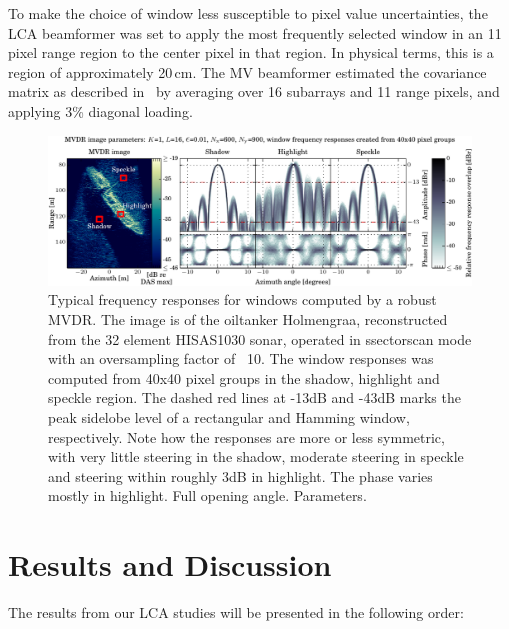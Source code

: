 \documentclass[10pt,journal,draftclsnofoot,onecolumn]{IEEEtran}
\let\MYoriglatexcaption\caption               %
\renewcommand{\caption}[2][\relax]{\MYoriglatexcaption[#2]{#2}}
\newcommand\1{\vec 1}
\begin{document}
To make the choice of window less susceptible to pixel value uncertainties, the LCA beamformer was set to apply the most frequently selected window in an 11 pixel range region to the center pixel in that region. In physical terms, this is a region of approximately 20\,cm. The MV beamformer estimated the covariance matrix as described in~\cite{syn07} by averaging over 16 subarrays and 11 range pixels, and applying 3\% diagonal loading.



\begin{figure}[tbhp!]\centering%
\includegraphics[width=\linewidth]{gfx/mvdr_selected_windows_holmengraa.pdf}%
\caption{Typical frequency responses for windows computed by a robust MVDR. The image is of the oiltanker Holmengraa, reconstructed from the 32 element HISAS1030 sonar, operated in ssectorscan mode with an oversampling factor of ~10. The window responses was computed from 40x40 pixel groups in the shadow, highlight and speckle region. The dashed red lines at -13dB and -43dB marks the peak sidelobe level of a rectangular and Hamming window, respectively. Note how the responses are more or less symmetric, with very little steering in the shadow, moderate steering in speckle and steering within roughly 3dB in highlight. The phase varies mostly in highlight. Full opening angle. Parameters. }\label{mvdr_selected_windows}
\end{figure}

\newpage



\section{Results and Discussion}

The results from our LCA studies will be presented in the following order:
\end{document}
